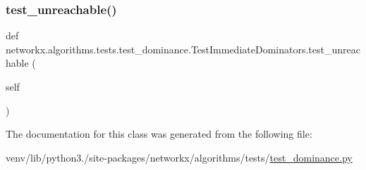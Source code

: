 \subsubsection{\texorpdfstring{test\+\_\+unreachable()}{test\_unreachable()}}
{\footnotesize\ttfamily def networkx.\+algorithms.\+tests.\+test\+\_\+dominance.\+Test\+Immediate\+Dominators.\+test\+\_\+unreachable (\begin{DoxyParamCaption}\item[{}]{self }\end{DoxyParamCaption})}



The documentation for this class was generated from the following file\+:\begin{DoxyCompactItemize}
\item 
venv/lib/python3./site-\/packages/networkx/algorithms/tests/\hyperlink{test__dominance_8py}{test\+\_\+dominance.\+py}\end{DoxyCompactItemize}
